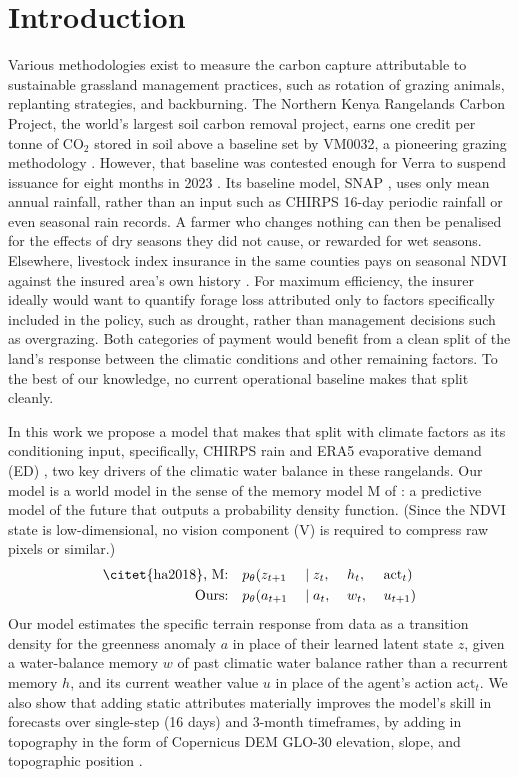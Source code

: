 \documentclass[letterpaper]{article} %
\begin{document}
\section{Introduction}
Various methodologies exist to measure the carbon capture attributable to sustainable grassland management practices, such as rotation of grazing animals, replanting strategies, and backburning. The Northern Kenya Rangelands Carbon Project, the world's largest soil carbon removal project, earns one credit per tonne of CO$_2$ stored in soil above a baseline set by VM0032, a pioneering grazing methodology \citep{vm0032,verra2023}. However, that baseline was contested enough for Verra to suspend issuance for eight months in 2023 \citep{verra2023}. Its baseline model, SNAP \citep{ritchie2014,nkgcp_pd2016}, uses only mean annual rainfall, rather than an input such as CHIRPS 16-day periodic rainfall \citep{chirps} or even seasonal rain records. A farmer who changes nothing can then be penalised for the effects of dry seasons they did not cause, or rewarded for wet seasons. Elsewhere, livestock index insurance in the same counties pays on seasonal NDVI against the insured area's own history \citep{deoto2019}. For maximum efficiency, the insurer ideally would want to quantify forage loss attributed only to factors specifically included in the policy, such as drought, rather than management decisions such as overgrazing. Both categories of payment would benefit from a clean split of the land's response between the climatic conditions and other remaining factors. To the best of our knowledge, no current operational baseline makes that split cleanly. 

In this work we propose a model that makes that split with climate factors as its conditioning input, specifically, CHIRPS rain and ERA5 evaporative demand (ED) \citep{hersbach2020}, two key drivers of the climatic water balance \citep{spei} in these rangelands. Our model is a world model in the sense of the memory model M of \citet{ha2018}: a predictive model of the future that outputs a probability density function. (Since the NDVI state is low-dimensional, no vision component (V) is required to compress raw pixels or similar.)
\begin{alignat*}{4}
\text{\citet{ha2018}, M:}\quad & p_\theta(z_{t+1} &&{}\mid z_t,\; && h_t,\; && \mathrm{act}_t)\\
\text{Ours:}\quad & p_\theta(a_{t+1} &&{}\mid a_t,\; && w_t,\; && u_{t+1})
\end{alignat*}
Our model estimates the specific terrain response from data as a transition density for the greenness anomaly $a$ in place of their learned latent state $z$, given a water-balance memory $w$ of past climatic water balance rather than a recurrent memory $h$, and its current weather value $u$ in place of the agent's action $\mathrm{act}_t$. We also show that adding static attributes \citep{kratzert2019} materially improves the model's skill in forecasts over single-step (16 days) and 3-month timeframes, by adding in topography in the form of Copernicus DEM GLO-30 elevation, slope, and topographic position \citep{copdem}.
\end{document}
